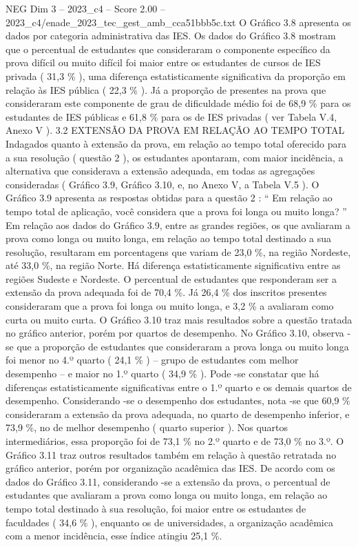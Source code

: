 \begin{textsample}{NEG Dim 3 – 2023\_c4 – Score 2.00 – 2023\_c4/enade\_2023\_tec\_gest\_amb\_cca51bbb5c.txt}
O Gráfico 3.8 apresenta os dados por categoria administrativa das IES.
Os dados do Gráfico 3.8 mostram que o percentual de estudantes que consideraram o componente específico da prova difícil ou muito difícil foi maior entre os estudantes de cursos de IES privada ( 31,3 \% ), uma diferença estatisticamente significativa da proporção em relação às IES pública ( 22,3 \% ).
Já a proporção de presentes na prova que consideraram este componente de grau de dificuldade médio foi de 68,9 \% para os estudantes de IES públicas e 61,8 \% para os de IES privadas ( ver Tabela V.4, Anexo V ). 3.2 EXTENSÃO DA PROVA EM RELAÇÃO AO TEMPO TOTAL Indagados quanto à extensão da prova, em relação ao tempo total oferecido para a sua resolução ( questão 2 ), os estudantes apontaram, com maior incidência, a alternativa que considerava a extensão adequada, em todas as agregações consideradas ( Gráfico 3.9, Gráfico 3.10, e, no Anexo V, a Tabela V.5 ).
O Gráfico 3.9 apresenta as respostas obtidas para a questão 2 : “ Em relação ao tempo total de aplicação, você considera que a prova foi longa ou muito longa? ” Em relação aos dados do Gráfico 3.9, entre as grandes regiões, os que avaliaram a prova como longa ou muito longa, em relação ao tempo total destinado a sua resolução, resultaram em porcentagens que variam de 23,0 \%, na região Nordeste, até 33,0 \%, na região Norte.
Há diferença estatisticamente significativa entre as regiões Sudeste e Nordeste.
O percentual de estudantes que responderam ser a extensão da prova adequada foi de 70,4 \%.
Já 26,4 \% dos inscritos presentes consideraram que a prova foi longa ou muito longa, e 3,2 \% a avaliaram como curta ou muito curta.
O Gráfico 3.10 traz mais resultados sobre a questão tratada no gráfico anterior, porém por quartos de desempenho.
No Gráfico 3.10, observa -se que a proporção de estudantes que consideraram a prova longa ou muito longa foi menor no 4.º quarto ( 24,1 \% ) – grupo de estudantes com melhor desempenho – e maior no 1.º quarto ( 34,9 \% ).
Pode -se constatar que há diferenças estatisticamente significativas entre o 1.º quarto e os demais quartos de desempenho.
Considerando -se o desempenho dos estudantes, nota -se que 60,9 \% consideraram a extensão da prova adequada, no quarto de desempenho inferior, e 73,9 \%, no de melhor desempenho ( quarto superior ).
Nos quartos intermediários, essa proporção foi de 73,1 \% no 2.º quarto e de 73,0 \% no 3.º.
O Gráfico 3.11 traz outros resultados também em relação à questão retratada no gráfico anterior, porém por organização acadêmica das IES.
De acordo com os dados do Gráfico 3.11, considerando -se a extensão da prova, o percentual de estudantes que avaliaram a prova como longa ou muito longa, em relação ao tempo total destinado à sua resolução, foi maior entre os estudantes de faculdades ( 34,6 \% ), enquanto os de universidades, a organização acadêmica com a menor incidência, esse índice atingiu 25,1 \%.

\end{textsample}
